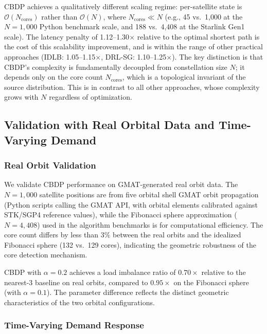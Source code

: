 \documentclass[sn-nature,pdflatex]{sn-jnl}
\begin{document}
CBDP achieves a qualitatively different scaling regime: per-satellite state is $\mathcal{O}(N_{\text{cores}})$ rather than $\mathcal{O}(N)$, where $N_{\text{cores}} \ll N$ (e.g., 45 vs.\ 1,000 at the $N=1,000$ Python benchmark scale, and 188 vs.\ 4,408 at the Starlink Gen1 scale).
The latency penalty of 1.12--1.30$\times$ relative to the optimal shortest path is the cost of this scalability improvement, and is within the range of other practical approaches (IDLB: 1.05--1.15$\times$, DRL-SG: 1.10--1.25$\times$).
The key distinction is that CBDP's complexity is fundamentally decoupled from constellation size $N$; it depends only on the core count $N_{\text{cores}}$, which is a topological invariant of the source distribution.
This is in contrast to all other approaches, whose complexity grows with $N$ regardless of optimization.

\subsection{Validation with Real Orbital Data and Time-Varying Demand}
\label{sec:validation}

\subsubsection{Real Orbit Validation}

We validate CBDP performance on GMAT-generated real orbit data. The $N=1,000$ satellite positions are from five orbital shell GMAT orbit propagation (Python scripts calling the GMAT API, with orbital elements calibrated against STK/SGP4 reference values), while the Fibonacci sphere approximation ($N=4,408$) used in the algorithm benchmarks is for computational efficiency.
The core count differs by less than $3\%$ between the real orbits and the idealized Fibonacci sphere (132 vs.\ 129 cores), indicating the geometric robustness of the core detection mechanism.

CBDP with $\alpha=0.2$ achieves a load imbalance ratio of $0.70\times$ relative to the nearest-3 baseline on real orbits, compared to $0.95\times$ on the Fibonacci sphere (with $\alpha=0.1$).
The parameter difference reflects the distinct geometric characteristics of the two orbital configurations.

\subsubsection{Time-Varying Demand Response}
\end{document}
